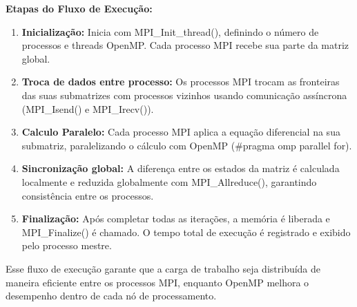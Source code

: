 \documentclass[12pt]{article}
\begin{document}
\textbf{Etapas do Fluxo de Execução:}
\begin{enumerate}
  \item \textbf{Inicialização:} Inicia com MPI\_Init\_thread(), definindo o número de processos e threads OpenMP. Cada processo MPI recebe sua parte da matriz global.
  \item \textbf{Troca de dados entre processo:} Os processos MPI trocam as fronteiras das suas submatrizes com processos vizinhos usando comunicação assíncrona (MPI\_Isend() e MPI\_Irecv()).
  \item \textbf{Calculo Paralelo:} Cada processo MPI aplica a equação diferencial na sua submatriz, paralelizando o cálculo com OpenMP (\#pragma omp parallel for).
  \item \textbf{Sincronização global:} A diferença entre os estados da matriz é calculada localmente e reduzida globalmente com MPI\_Allreduce(), garantindo consistência entre os processos.
  \item \textbf{Finalização:} Após completar todas as iterações, a memória é liberada e MPI\_Finalize() é chamado. O tempo total de execução é registrado e exibido pelo processo mestre.

\end{enumerate}

Esse fluxo de execução garante que a carga de trabalho seja distribuída de
maneira eficiente entre os processos MPI, enquanto OpenMP melhora o desempenho
dentro de cada nó de processamento.
\end{document}
